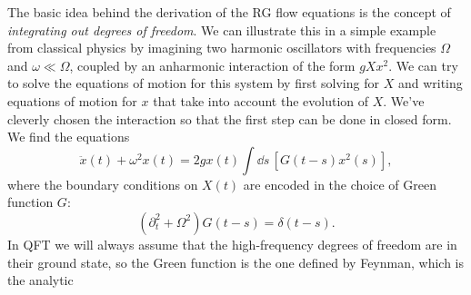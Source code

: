 
The basic idea behind the derivation of the RG flow equations is the concept
of \emph{integrating out degrees of freedom}. We can illustrate this in a
simple example from classical physics by imagining two harmonic oscillators
with frequencies $\Omega$ and $\omega\ll\Omega$, coupled by an anharmonic
interaction of the form $gXx^2$. We can try to solve the equations of motion
for this system by first solving for $X$ and writing equations of motion for
$x$ that take into account the evolution of $X$. We've cleverly chosen the
interaction so that the first step can be done in closed form. We find the
equations
\[
  \ddot x(t)+\omega^2x(t)=2gx(t)\int\!\dd s\,[G(t-s)x^2(s)],
\]
where the boundary conditions on $X(t)$ are encoded in the choice of Green
function $G$:
\[
  (\partial_t^2+\Omega^2)G(t-s)=\delta(t-s).
\]
In QFT we will always assume that the high-frequency degrees of freedom are
in their ground state, so the Green function is the one defined by Feynman,
which is the analytic
